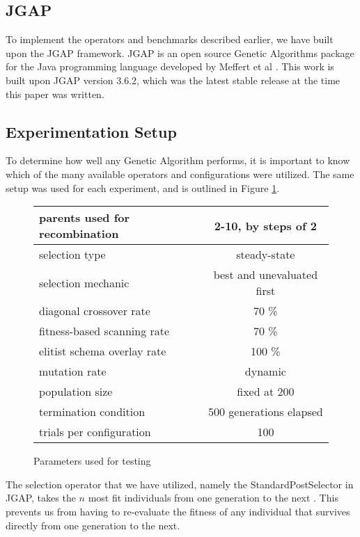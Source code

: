 \subsection*{JGAP}
To implement the operators and benchmarks described earlier, we have built upon the JGAP framework. JGAP is an open source Genetic Algorithms package for the Java programming language developed by Meffert et al \cite{jgap}. This work is built upon JGAP version 3.6.2, which was the latest stable release at the time this paper was written.

\subsection*{Experimentation Setup}

To determine how well any Genetic Algorithm performs, it is important to know which of the many available operators and configurations were utilized. The same setup was used for each experiment, and is outlined in Figure \ref{GA-config}. 

\begin{figure}[h]
\begin{center}
\begin{tabular}{ | l | c | }
\hline
parents used for recombination & 2-10, by steps of 2 \\
\hline
selection type & steady-state \\
\hline
selection mechanic & best and unevaluated first \\
\hline
diagonal crossover rate & 70 \% \\
\hline
fitness-based scanning rate & 70 \% \\
\hline
elitist schema overlay rate & 100 \% \\
\hline
mutation rate & dynamic \cite{Back93} \\
\hline
population size & fixed at 200 \\
\hline
termination condition & 500 generations elapsed \\
\hline
trials per configuration & 100 \\
\hline
\end{tabular}
\caption{Parameters used for testing}
\end{center}
\label{GA-config}
\end{figure}

The selection operator that we have utilized, namely the StandardPostSelector in JGAP, takes the $n$ most fit individuals from one generation to the next \cite{jgap}. This prevents us from having to re-evaluate the fitness of any individual that survives directly from one generation to the next.

